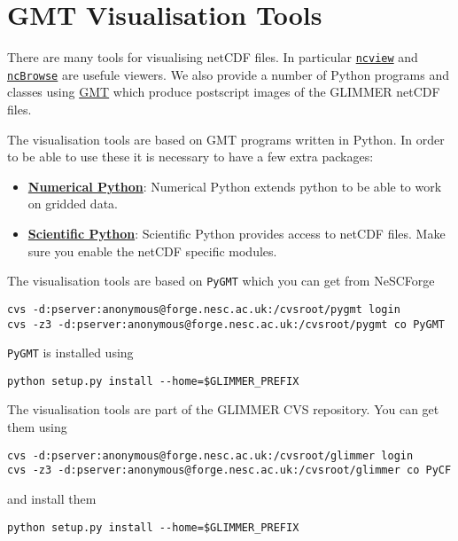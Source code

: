 \section{GMT Visualisation Tools}
There are many tools for visualising netCDF files. In particular \href{http://meteora.ucsd.edu/~pierce/ncview\_home\_page.html}{\texttt{ncview}} and \href{http://www.epic.noaa.gov/java/ncBrowse/}{\texttt{ncBrowse}} are usefule viewers. We also provide a number of Python programs and classes using \href{http://gmt.soest.hawaii.edu/}{GMT} which produce postscript images of the GLIMMER netCDF files.

The visualisation tools are based on GMT programs written in Python. In order to be able to use these it is necessary to have a few extra packages:
\begin{itemize}
\item \href{http://www.pfdubois.com/numpy/}{{\bf Numerical Python}}: Numerical Python extends python to be able to work on gridded data.
\item \href{http://starship.python.net/~hinsen/ScientificPython/}{{\bf Scientific Python}}: Scientific Python provides access to netCDF files. Make sure you enable the netCDF specific modules.
\end{itemize}

The visualisation tools are based on \texttt{PyGMT} which you can get from NeSCForge
{\small
\begin{verbatim}
cvs -d:pserver:anonymous@forge.nesc.ac.uk:/cvsroot/pygmt login
cvs -z3 -d:pserver:anonymous@forge.nesc.ac.uk:/cvsroot/pygmt co PyGMT
\end{verbatim}}
\texttt{PyGMT} is installed using
{\small
\begin{verbatim}
python setup.py install --home=$GLIMMER_PREFIX
\end{verbatim}}

The visualisation tools are part of the GLIMMER CVS repository. You can get them using
{\small
\begin{verbatim}
cvs -d:pserver:anonymous@forge.nesc.ac.uk:/cvsroot/glimmer login
cvs -z3 -d:pserver:anonymous@forge.nesc.ac.uk:/cvsroot/glimmer co PyCF
\end{verbatim}}
and install them
{\small
\begin{verbatim}
python setup.py install --home=$GLIMMER_PREFIX
\end{verbatim}}
